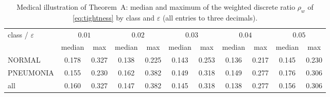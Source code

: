 \begin{table}[tbp]
\centering
\setlength{\tabcolsep}{4pt}
\caption{Medical illustration of Theorem~A: median and maximum of the
weighted discrete ratio $\rho_w$ of \cref{eq:tightness} by class and
$\varepsilon$ (all entries to three decimals).}
\label{tab:medical-rho}
\begin{tabular}{@{}lS[table-format=1.3]S[table-format=1.3]S[table-format=1.3]S[table-format=1.3]S[table-format=1.3]S[table-format=1.3]S[table-format=1.3]S[table-format=1.3]S[table-format=1.3]S[table-format=1.3]@{}}
\toprule
class / $\varepsilon$ &  &  &  &  &  \\
\cmidrule(lr){2-3} \cmidrule(lr){4-5} \cmidrule(lr){6-7} \cmidrule(lr){8-9} \cmidrule(lr){10-11}
 & {median} & {max} & {median} & {max} & {median} & {max} & {median} & {max} & {median} & {max} \\
\midrule
NORMAL & 0.178 & 0.327 & 0.138 & 0.225 & 0.143 & 0.253 & 0.136 & 0.217 & 0.145 & 0.230 \\
PNEUMONIA & 0.155 & 0.230 & 0.162 & 0.382 & 0.149 & 0.318 & 0.149 & 0.277 & 0.176 & 0.306 \\
\midrule
all & 0.160 & 0.327 & 0.147 & 0.382 & 0.145 & 0.318 & 0.138 & 0.277 & 0.156 & 0.306 \\
\bottomrule
\end{tabular}
\end{table}
